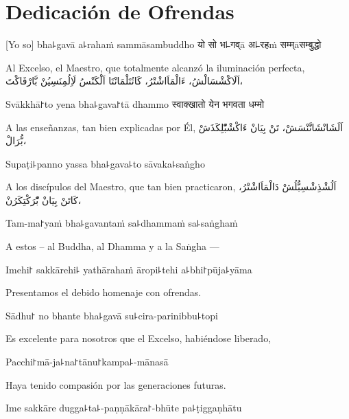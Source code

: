 \chapter{Dedicación de Ofrendas}

[Yo so] bha꜕gavā a꜕rahaṁ sammāsambuddho
यो सो भ꜕गव्ā अ꜕रहṁ सम्म्āसम्बुद्धो 

\begin{english}
Al Excelso, el Maestro, que totalmente alcanzó la iluminación perfecta,
اَلَاکْشْسَالْشُ، ءَالْمَاَاشْتْرُ، کَاتُتَلْمَانْتَا اَلْکَنْسُ لَاِلُمِنَسِيُنْ بَّارْفَاکْتَ،
\end{english}

Svākkhā꜓to yena bha꜕gava꜓tā dhammo
स्वाक्खातो येन भगवता धम्मो
\begin{english}
A las enseñanzas, tan bien explicadas por Él,
اَلَشَانْشَانَّنْسَشْ، تَنْ بِيَانْ ءَاکْشْبّْلِکَذَشْ بُّرَالْ،
\end{english}

Supaṭi꜕panno yassa bha꜕gava꜕to sāvaka꜕saṅgho

\begin{english}
A los discípulos del Maestro, que tan bien practicaron,
اَلُشْذِشْسِبُّلُشْ دَالْمَاَاشْتْرُ، کَاتَنْ بِيَانْ بّْرَکْتِکَرُنْ،
\end{english}

Tam-ma꜓yaṁ bha꜕gavantaṁ sa꜕dhammaṁ sa꜕saṅghaṁ

\begin{english}
A estos – al Buddha, al Dhamma y a la Saṅgha ---
\end{english}

Imehi꜓ sakkārehi꜕ yathārahaṁ āropi꜕tehi a꜕bhi꜓pūja꜕yāma

\begin{english}
Presentamos el debido homenaje con ofrendas.
\end{english}

Sādhu꜓ no bhante bha꜕gavā su꜕cira-parinibbu꜕topi

\begin{english}
Es excelente para nosotros que el Excelso, habiéndose liberado, 
\end{english}

Pacchi꜓mā-ja꜕na꜓tānu꜓kampa꜕-mānasā

\begin{english}
Haya tenido compasión por las generaciones futuras.
\end{english}

Ime sakkāre dugga꜕ta꜕-paṇṇākāra꜓-bhūte pa꜕ṭiggaṇhātu

